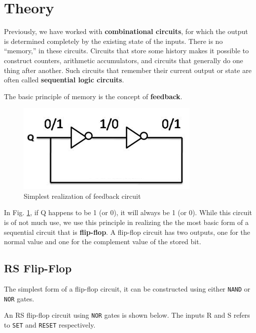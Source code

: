 \section{Theory}

Previously, we have worked with \textbf{combinational circuits}, for which the output
is determined completely by the existing state of the inputs. There is no “memory,” in these circuits. Circuits that store some history makes it possible to construct counters, arithmetic accumulators, and circuits that generally do one thing after another. Such circuits that remember their current output or state are often called \textbf{sequential logic circuits}.

The basic principle of memory is the concept of \textbf{feedback}.

\begin{figure}[H]
    \centering
    \includegraphics[width=0.50\columnwidth]{images/feed.png}
    \caption{Simplest realization of feedback circuit}
    \label{feedback}
\end{figure}

In Fig. \ref{feedback}, if Q happens to be 1 (or 0), it will always be 1 (or 0). While this circuit is of not much use, we use this principle in realizing the the most basic form of a sequential circuit that is \textbf{flip-flop}. A flip-flop circuit has two outputs, one for the normal value and one for the complement value of the stored bit.

\subsection*{RS Flip-Flop}
The simplest form of a flip-flop circuit, it can be constructed using either \verb|NAND| or \verb|NOR| gates.

An RS flip-flop circuit using \verb|NOR| gates is shown below. The inputs R and S refers to \verb|SET| and \verb|RESET| respectively.

